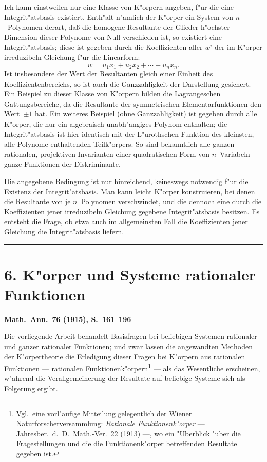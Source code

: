 \documentclass[11pt,a4paper]{article}
\begin{document}
Ich kann einstweilen nur eine Klasse von K"{o}rpern angeben, f"{u}r
die eine Integrit"{a}tsbasis existiert. Enth"{a}lt n"{a}mlich der K"{o}rper ein
System von $n$~Polynomen derart, da\ss{} die homogene Resultante der
Glieder h"{o}chster Dimension dieser Polynome von Null verschieden ist,
so existiert eine Integrit"{a}tsbasis; diese ist gegeben durch die Koeffizienten
aller $w^{i}$ der im K"{o}rper irreduzibeln Gleichung f"{u}r die Linearform:
\[w=u_{1}x_{1}+u_{2}x_{2}+\cdots+u_{n}x_{n}.\]
Ist insbesondere der Wert der Resultanten gleich einer Einheit des
Koeffizientenbereichs, so ist auch die Ganzzahligkeit der Darstellung
gesichert. Ein Beispiel zu dieser Klasse von K"{o}rpern bilden die
Lagrangeschen Gattungsbereiche, da die Resultante der symmetrischen
Elementarfunktionen den Wert~$\pm 1$ hat. Ein weiteres Beispiel (ohne
Ganzzahligkeit) ist gegeben durch alle K"{o}rper, die nur ein algebraisch
unabh"{a}ngiges Polynom enthalten; die Integrit"{a}tsbasis ist hier identisch
mit der L"{u}rothschen Funktion des kleinsten, alle Polynome enthaltenden
Teilk"{o}rpers. So sind bekanntlich alle ganzen rationalen, projektiven
Invarianten einer quadratischen Form von $n$~Variabeln ganze Funktionen
der Diskriminante.

Die angegebene Bedingung ist nur hinreichend, keineswegs notwendig
f"{u}r die Existenz der Integrit"{a}tsbasis. Man kann leicht K"{o}rper
konstruieren, bei denen die Resultante von je $n$~Polynomen verschwindet,
und die dennoch eine durch die Koeffizienten jener irreduzibeln Gleichung
gegebene Integrit"{a}tsbasis besitzen. Es entsteht die Frage, ob etwa auch
im allgemeinsten Fall die Koeffizienten jener Gleichung die Integrit"{a}tsbasis
liefern.

\bigskip
\hrule
\bigskip

\section*{6. K"{o}rper und Systeme rationaler Funktionen}

\textbf{Math.\ Ann.\ 76 (1915), S.\ 161--196}

\smallskip
\noindent
Die vorliegende Arbeit behandelt Basisfragen bei beliebigen Systemen
rationaler und ganzer rationaler Funktionen; und zwar lassen die angewandten
Methoden der K"{o}rpertheorie die Erledigung dieser Fragen bei
K"{o}rpern aus rationalen Funktionen --- rationalen Funktionenk"{o}rpern\footnote{Vgl.\ eine vorl"{a}ufige Mitteilung gelegentlich der Wiener Naturforscherversammlung:
\emph{Rationale Funktionenk"{o}rper} --- Jahresber.\ d.\ D.\ Math.-Ver.\ 22 (1913) ---,
wo ein "{U}berblick "{u}ber die Fragestellungen und die die Funktionenk"{o}rper betreffenden
Resultate gegeben ist.} ---
als das Wesentliche erscheinen, w"{a}hrend die Verallgemeinerung der Resultate
auf beliebige Systeme sich als Folgerung ergibt.
\end{document}
